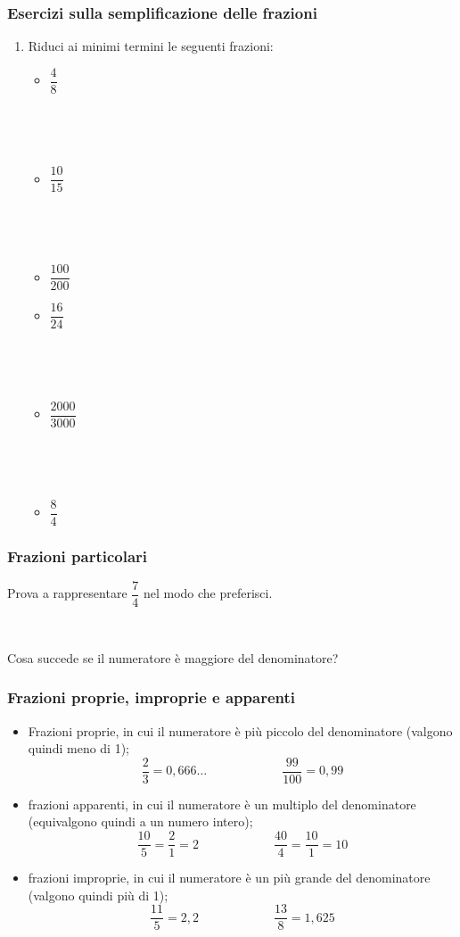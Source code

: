 \documentclass[]{beamer}
\theoremstyle{plain}
\begin{document}
\begin{frame}
  \frametitle{Esercizi sulla semplificazione delle frazioni}
  \begin{enumerate}
    \item Riduci ai minimi termini le seguenti frazioni:
    \begin{multicols}{2}
      \begin{itemize}
          \item $ \dfrac{4}{8} $
          
          ~

          ~
          \item $ \dfrac{10}{15} $
          
          ~

          ~
          \item $ \dfrac{100}{200} $
          \item $ \dfrac{16}{24} $
          
          ~

          ~
          \item $ \dfrac{2000}{3000} $
          
          ~

          ~
          \item $ \dfrac{8}{4} $
      \end{itemize}
    \end{multicols}
  \end{enumerate}
  \end{frame}






\begin{frame}
\frametitle{Frazioni particolari}
Prova a rappresentare $ \dfrac{7}{4} $ nel modo che preferisci. \pause

~

Cosa succede se il numeratore è maggiore del denominatore?
\end{frame}

\begin{frame}
\frametitle{Frazioni proprie, improprie e apparenti}
\begin{itemize}
  \item \alert{Frazioni proprie}, in cui il numeratore è più piccolo del denominatore (valgono quindi \alert{meno di 1});
  \[\frac{2}{3}=0,666\ldots\qquad\qquad\qquad\frac{99}{100}=0,99\]\pause
  \item \alert{frazioni apparenti}, in cui il numeratore è un multiplo del denominatore (equivalgono quindi a \alert{un numero intero});
  \[\frac{10}{5}=\frac{2}{1}=2\qquad\qquad\qquad\frac{40}{4}=\frac{10}{1}=10\]\pause
  \item \alert{frazioni improprie}, in cui il numeratore è un più grande del denominatore (valgono quindi \alert{più di 1});
  \[\frac{11}{5}=2,2\qquad\qquad\qquad\frac{13}{8}=1,625\]
\end{itemize}
\end{frame}
\end{document}
